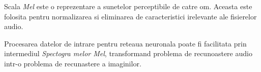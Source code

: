 \documentclass[a4paper]{article}
\begin{document}
Scala \textit{Mel} este o reprezentare a sunetelor perceptibile de catre om. Aceasta este folosita pentru
normalizarea si eliminarea de caracteristici irelevante ale fisierelor audio.


Procesarea datelor de intrare pentru reteaua neuronala poate fi facilitata prin intermediul \textit{Spectogra
melor Mel}, transformand problema de recunoastere audio intr-o problema de recunastere a imaginilor.

\printbibliography[title=Bibliografie]
\end{document}
